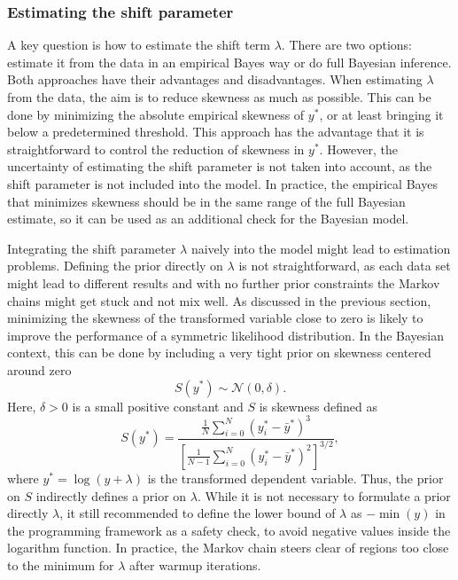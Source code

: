 \subsubsection{Estimating the shift parameter}
A key question is how to estimate the shift term $\lambda$.
There are two options: estimate it from the data in an empirical Bayes way or do full Bayesian inference.
Both approaches have their advantages and disadvantages.
When estimating $\lambda$ from the data, the aim is to reduce skewness as much as possible.
This can be done by minimizing the absolute empirical skewness of $y^*$, or at least bringing it below a predetermined threshold.
This approach has the advantage that it is straightforward to control the reduction of skewness in $y^*$.
However, the uncertainty of estimating the shift parameter is not taken into account, as the shift parameter is not included into the model.
In practice, the empirical Bayes that minimizes skewness should be in the same range of the full Bayesian estimate, so it can be used as an additional check for the Bayesian model.

Integrating the shift parameter $\lambda$ naively into the model might lead to estimation problems.
Defining the prior directly on $\lambda$ is not straightforward, as each data set might lead to different results and with no further prior constraints the Markov chains might get stuck and not mix well.
As discussed in the previous section, minimizing the skewness of the transformed variable close to zero is likely to improve the performance of a symmetric likelihood distribution.
In the Bayesian context, this can be done by including a very tight prior on skewness centered around zero
\begin{equation*}
    S(y^*) \sim \mathcal N(0, \delta).
\end{equation*}
Here, $\delta > 0$ is a small positive constant and $S$ is skewness defined as
\begin{equation*}
    \displaystyle S(y^*) =  \frac{\frac 1 N \sum^{N}_{i = 0} (y_i^* - \bar y^* )^3}
    {\left[ \frac{1}{N - 1} \sum^{N}_{i = 0} (y_i^* - \bar y^* )^2 \right]^{3/2}},
\end{equation*}
where $y^* = \log(y + \lambda)$ is the transformed dependent variable. Thus, the prior on $S$ indirectly defines a prior on $\lambda$.
While it is not necessary to formulate a prior directly $\lambda$, it still recommended to define the lower bound of $\lambda$ as $-\min(y)$ in the programming framework as a safety check, to avoid negative values inside the logarithm function.
In practice, the Markov chain steers clear of regions too close to the minimum for $\lambda$ after warmup iterations.



